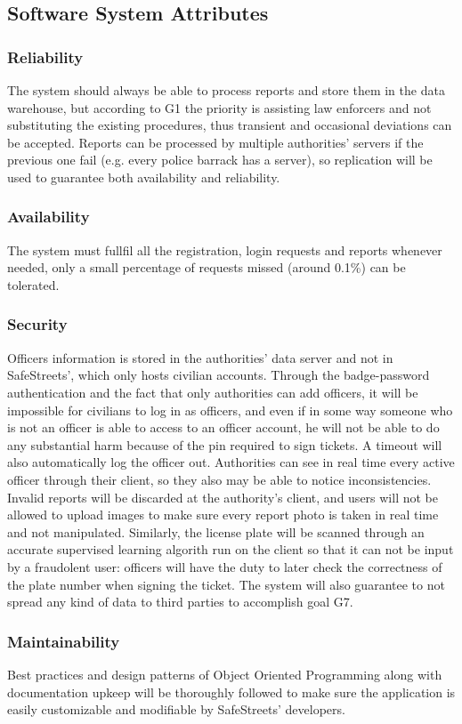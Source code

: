 \documentclass[12pt,a4paper]{article}
\begin{document}
\subsection{Software	System	Attributes} 
\subsubsection{Reliability}
The system should always be able to process reports and store them in the data warehouse, but according to G1 the priority is assisting law enforcers and not substituting the existing procedures, thus transient and occasional deviations can be accepted.  Reports can be processed by multiple authorities' servers if the previous one fail (e.g. every police barrack has a server), so replication will be used to guarantee both availability and reliability.
\subsubsection{Availability}
The system must fullfil all the registration, login requests and reports whenever needed, only a small percentage of requests missed (around 0.1\%) can be tolerated. 
\subsubsection{Security}
Officers information is stored in the authorities' data server and not in SafeStreets', which only hosts civilian accounts. Through the badge-password authentication and the fact that only authorities can add officers, it will be impossible for civilians to log in as officers, and even if in some way someone who is not an officer is able to access to an officer account, he will not be able to do any substantial harm because of the pin required to sign tickets. A timeout will also automatically log the officer out. Authorities can see in real time every active officer through their client, so they also may be able to notice inconsistencies. Invalid reports will be discarded at the authority's client, and users will not be allowed to upload images to make sure every report photo is taken in real time and not manipulated. Similarly, the license plate will be scanned through an accurate supervised learning algorith run on the client so that it can not be input by a fraudolent user: officers will have the duty to later check the correctness of the plate number when signing the ticket.
The system will also guarantee to not spread any kind of data to third parties to accomplish goal G7.
\subsubsection{Maintainability}
Best practices and design patterns of Object Oriented Programming along with documentation upkeep will be thoroughly followed to make sure the application is easily customizable and modifiable by SafeStreets' developers.
\end{document}
